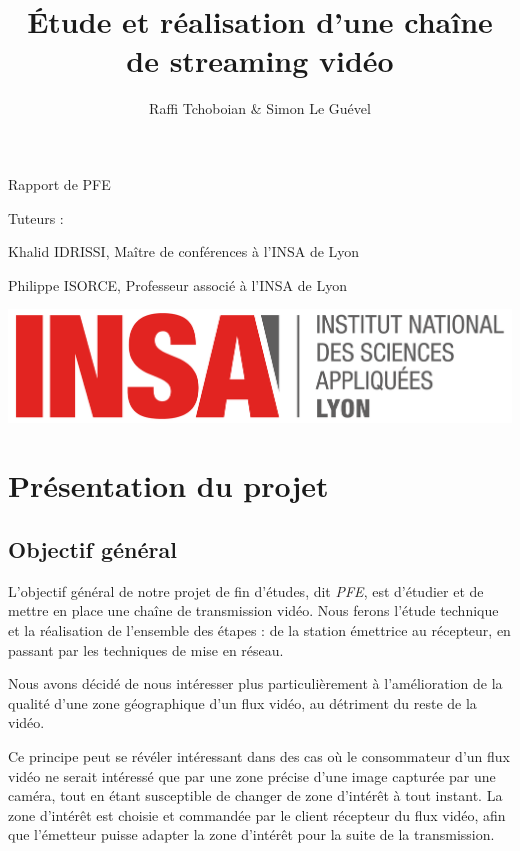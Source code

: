 \documentclass[11pt,a4paper]{article}
\title{Étude et réalisation d'une chaîne de streaming vidéo}
\author{Raffi Tchoboian \& Simon Le Guével}
\begin{document}
\maketitle

\vspace{1cm}
\begin{center}
Rapport de PFE
\end{center}

\vspace{4cm}

\noindent
Tuteurs :

Khalid IDRISSI, Maître de conférences à l'INSA de Lyon

Philippe ISORCE, Professeur associé à l'INSA de Lyon

\vspace{6cm}
\begin{center}
\includegraphics[scale=0.5]{images/insa.png}
\end{center}

\newpage

\setcounter{tocdepth}{2}
\tableofcontents

\newpage
{}

\section{Présentation du projet}

\subsection{Objectif général}
L'objectif général de notre projet de fin d'études, dit \textit{PFE}, est d'étudier et de mettre en place une chaîne de transmission vidéo.
Nous ferons l'étude technique et la réalisation de l'ensemble des étapes : de la station émettrice au récepteur, en passant par les techniques de mise en réseau.

\bigbreak
Nous avons décidé de nous intéresser plus particulièrement à l'amélioration de la qualité d'une zone géographique d'un flux vidéo, au détriment du reste de la vidéo.

Ce principe peut se révéler intéressant dans des cas où le consommateur d'un flux vidéo ne serait intéressé que par une zone précise d'une image capturée par une caméra, tout en étant susceptible de changer de zone d'intérêt à tout instant.
La zone d'intérêt est choisie et commandée par le client récepteur du flux vidéo, afin que l'émetteur puisse adapter la zone d’intérêt pour la suite de la transmission.
\end{document}
